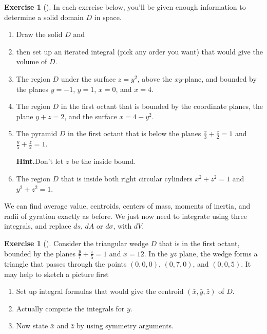 \documentclass[10pt,]{book}
\theoremstyle{plain}
\theoremstyle{definition}
\theoremstyle{definition}
\theoremstyle{definition}
\theoremstyle{definition}
\newtheorem{exploration}[project]{Exercise}
\theoremstyle{definition}
\numberwithin{equation}{section}
\newcommand{\ds}{\displaystyle}
\begin{document}
\begin{exploration}[]\label{exploration-297}
In each exercise below, you'll be given enough information to determine a solid domain \(D\) in space.%
\begin{enumerate}[font=\bfseries,label=(\alph*),ref=\alph*]
\item\label{task-822} Draw the solid \(D\) and%
\item\label{task-823} then set up an iterated integral (pick any order you want) that would give the volume of \(D\).%
\item\label{task-824} The region \(D\) under the surface \(z=y^2\), above the \(xy\)-plane, and bounded by the planes \(y=-1\), \(y=1\), \(x=0\), and \(x=4\).%
\item\label{task-825} The region \(D\) in the first octant that is bounded by the coordinate planes, the plane \(y+z=2\), and the surface \(x=4-y^2\).%
\item\label{task-826} The pyramid \(D\) in the first octant that is below the planes \(\ds\frac{x}{3}+\frac{z}{2}=1\) and \(\ds\frac{y}{5}+\frac{z}{2}=1\).%
\par\medskip\noindent%
\textbf{Hint.}\quad Don't let \(z\) be the inside bound.%
\item\label{task-827} The region \(D\) that is inside both right circular cylinders \(x^2+z^2=1\) and \(y^2+z^2=1\).%
\end{enumerate}
\end{exploration}
We can find average value, centroids, centers of mass, moments of inertia, and radii of gyration exactly as before. We just now need to integrate using three integrals, and replace \(ds\), \(dA\) or \(d\sigma\), with \(dV\).%
\begin{exploration}[]\label{exploration-298}
Consider the triangular wedge \(D\) that is in the first octant, bounded by the planes \(\ds\frac{y}{7}+\frac{z}{5}=1\) and \(x=12\). In the \(yz\) plane, the wedge forms a triangle that passes through the points \((0,0,0)\), \((0,7,0)\), and \((0,0,5)\).%
It may help to sketch a picture first%
\begin{enumerate}[font=\bfseries,label=(\alph*),ref=\alph*]
\item\label{task-828} Set up integral formulas that would give the centroid \((\bar x,\bar y, \bar z)\) of \(D\).%
\item\label{task-829} Actually compute the integrals for \(\bar y\).%
\item\label{task-830} Now state \(\bar x\) and \(\bar z\) by using symmetry arguments.%
\end{enumerate}
\end{exploration}
\end{document}
